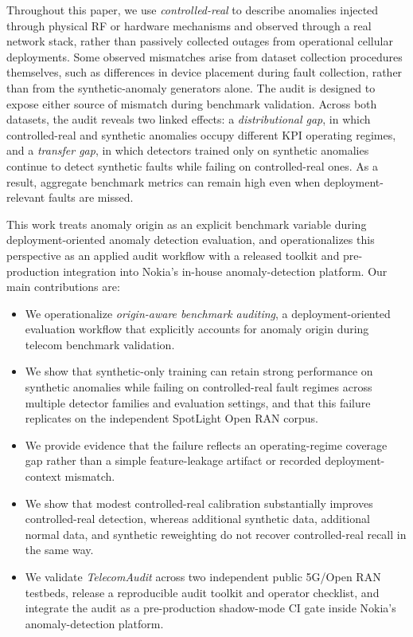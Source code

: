 \documentclass[sigconf,review]{acmart}
\begin{document}
Throughout this paper, we use \emph{controlled-real} to describe anomalies injected through physical RF or hardware mechanisms and observed through a real network stack, rather than passively collected outages from operational cellular deployments. Some observed mismatches arise from dataset collection procedures themselves, such as differences in device placement during fault collection, rather than from the synthetic-anomaly generators alone. The audit is designed to expose either source of mismatch during benchmark validation. Across both datasets, the audit reveals two linked effects: a \emph{distributional gap}, in which controlled-real and synthetic anomalies occupy different KPI operating regimes, and a \emph{transfer gap}, in which detectors trained only on synthetic anomalies continue to detect synthetic faults while failing on controlled-real ones. As a result, aggregate benchmark metrics can remain high even when deployment-relevant faults are missed.

This work treats anomaly origin as an explicit benchmark variable during deployment-oriented anomaly detection evaluation, and operationalizes this perspective as an applied audit workflow with a released toolkit and pre-production integration into Nokia's in-house anomaly-detection platform.
Our main contributions are:

\begin{itemize}[leftmargin=*,nosep]
  \item We operationalize \emph{origin-aware benchmark auditing}, a deployment-oriented evaluation workflow that explicitly accounts for anomaly origin during telecom benchmark validation.

  \item We show that synthetic-only training can retain strong performance on synthetic anomalies while failing on controlled-real fault regimes across multiple detector families and evaluation settings, and that this failure replicates on the independent SpotLight Open RAN corpus.

  \item We provide evidence that the failure reflects an operating-regime coverage gap rather than a simple feature-leakage artifact or recorded deployment-context mismatch.

  \item We show that modest controlled-real calibration substantially improves controlled-real detection, whereas additional synthetic data, additional normal data, and synthetic reweighting do not recover controlled-real recall in the same way.

  \item We validate \emph{TelecomAudit} across two independent public 5G/Open RAN testbeds, release a reproducible audit toolkit and operator checklist, and integrate the audit as a pre-production shadow-mode CI gate inside Nokia's anomaly-detection platform.
\end{itemize}
\end{document}
